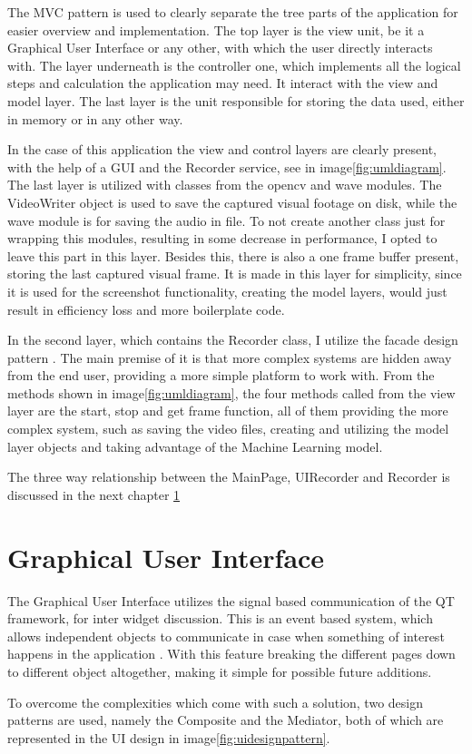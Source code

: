 \par The MVC pattern is used to clearly separate the tree parts of the application for easier overview and implementation. The top layer is the view unit, be it a Graphical User Interface or any other, with which the user directly interacts with. The layer underneath is the controller one, which implements all the logical steps and calculation the application may need. It interact with the view and model layer. The last layer is the unit responsible for storing the data used, either in memory or in any other way.
\par In the case of this application the view and control layers are clearly present, with the help of a GUI and the Recorder service, see in image\ref{fig:umldiagram}. The last layer is utilized with classes from the opencv and wave modules. The VideoWriter object is used to save the captured visual footage on disk, while the wave module is for saving the audio in file. To not create another class just for wrapping this modules, resulting in some decrease in performance, I opted to leave this part in this layer. Besides this, there is also a one frame buffer present, storing the last captured visual frame. It is made in this layer for simplicity, since it is used for the screenshot functionality, creating the model layers, would just result in efficiency loss and more boilerplate code. 
\par In the second layer, which contains the Recorder class, I utilize the facade design pattern \cite{facade}. The main premise of it is that more complex systems are hidden away from the end user, providing a more simple platform to work with. From the methods shown in image\ref{fig:umldiagram}, the four methods called from the view layer are the start, stop and get frame function, all of them providing the more complex system, such as saving the video files, creating and utilizing the model layer objects and taking advantage of the Machine Learning model.
\par The three way relationship between the MainPage, UIRecorder and Recorder is discussed in the next chapter \ref{sec:designsec1}

\section{Graphical User Interface}
\label{sec:designsec1}
\par The Graphical User Interface utilizes the signal based communication of the QT framework, for inter widget discussion. This is an event based system, which allows independent objects to communicate in case when something of interest happens in the application \cite{qtSignal}. With this feature breaking the different pages down to different object altogether, making it simple for possible future additions.
\par To overcome the complexities which come with such a solution, two design patterns are used, namely the Composite and the Mediator, both of which are represented in the UI design in image\ref{fig:uidesignpattern}.

